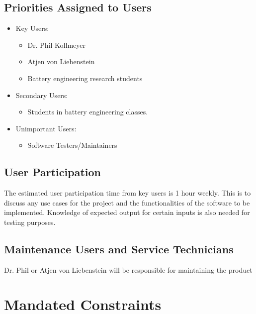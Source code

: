 \documentclass[12pt]{article}
\begin{document}
\subsection{Priorities Assigned to Users}
\begin{itemize}
    \item Key Users:
    \begin{itemize}
        \item Dr. Phil Kollmeyer
        \item Atjen von Liebenstein
        \item Battery engineering research students
    \end{itemize}
    \item Secondary Users:
    \begin{itemize}
        \item Students in battery engineering classes.
    \end{itemize}
    \item Unimportant Users:
    \begin{itemize}
        \item Software Testers/Maintainers
    \end{itemize}
\end{itemize}

\subsection{User Participation}
The estimated user participation time from key users is 1 hour weekly. This is to discuss any use cases for the project and the functionalities of the software to be implemented. Knowledge of expected output for certain inputs is also needed for testing purposes.
\subsection{Maintenance Users and Service Technicians}
Dr. Phil or Atjen von Liebenstein will be responsible for maintaining the product

\section{Mandated Constraints}
\end{document}
